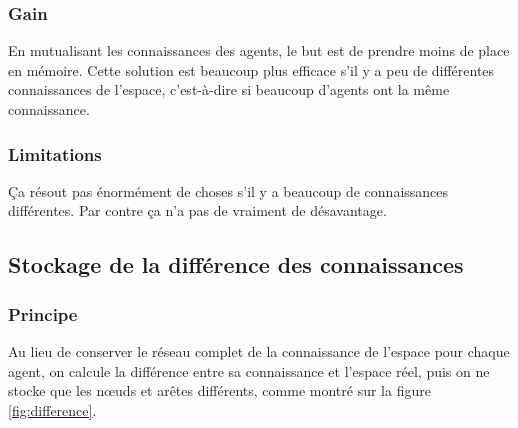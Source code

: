 \documentclass[a4paper]{article}
\begin{document}
    \subsubsection{Gain}

En mutualisant les connaissances des agents, le but est de prendre moins de
place en mémoire. Cette solution est beaucoup plus efficace s'il y a peu de
différentes connaissances de l'espace, c'est-à-dire si beaucoup d'agents ont la
même connaissance.

    \subsubsection{Limitations}

Ça résout pas énormément de choses s'il y a beaucoup de connaissances
différentes. Par contre ça n'a pas de vraiment de désavantage.

  \subsection{Stockage de la différence des connaissances}
  \label{sec:difference}

    \subsubsection{Principe}

Au lieu de conserver le réseau complet de la connaissance de l'espace pour
chaque agent, on calcule la différence entre sa connaissance et l'espace réel,
puis on ne stocke que les nœuds et arêtes différents, comme montré sur la figure
\ref{fig:difference}.
\end{document}
